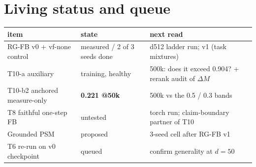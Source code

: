 \documentclass[11pt]{article}
\newcommand{\numgood}[1]{\textbf{\textcolor{green!45!black}{#1}}}
\begin{document}
\section{Living status and queue}
\begin{center}\small\begin{tabular}{lll}
\toprule
item & state & next read \\
\midrule
RG-FB v0 + vf-none control & measured / 2 of 3 seeds done & d512 ladder run; v1 (task mixtures) \\
T10-a auxiliary & training, healthy & 500k: does it exceed 0.904? + rerank audit of $\Delta M$ \\
T10-b2 anchored measure-only & \numgood{0.221 @50k} & 500k vs the 0.5 / 0.3 bands \\
T8 faithful one-step FB & untested & torch run; claim-boundary partner of T10 \\
Grounded PSM & proposed & 3-seed cell after RG-FB v1 \\
T6 re-run on v0 checkpoint & queued & confirm generality at $d{=}50$ \\
\bottomrule
\end{tabular}\end{center}
\end{document}
